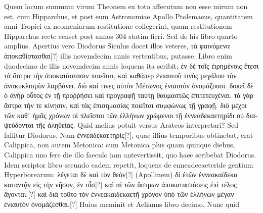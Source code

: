 Quem locum summum virum Theonem ex toto affecutum non
esse mirum non est, cum Hipparchus, et post eum Astronomiae
Apollo Ptolemaeus, quantitatem anni Tropici ex neomeniarum
restitutione collegerint, quam restitutionem Hipparchus recte
censet post annos 304 statim fieri.
Sed de his libro quarto amplius.
Apertius vero Diodorus Siculus docet illos veteres,
 \textgreek{τὰ φαινόμενα ἀποκαθίστασθαι[?]}
illis novemdecim annis vertentibus, putasse.
Libro
enim duodecimo de illis novemdecim annis loquens ita scribit;
\textgreek{ἐν δὲ τοῖς ἐιρημένοις ἔτεσι τὰ ἄστρα τὴν ἀποκατάστασιν ποιεῖται,
 καὶ καθάπερ
ἐνιαυτοῦ τινὸς μεγάλου τὸν ἀνακυκλισμὸν λαμβάνει.}
\textgreek{διὸ καί τινες αὐτὸν Μέτωνος
ἐνιαυτὸν ὀνομάζουσι.}
\textgreek{δοκεῖ δὲ ὁ ἀνὴρ οὗτος ἐν τῇ προῤῥήσει καὶ προγραφῇ
ταύτῃ θαυμαστῶς ἐπιτετευχέναι.}
\textgreek{τὰ γὰρ ἄστρα τήν τε κίνησιν, καὶ τὰς ἐπισημασίας
ποιεῖται συμφώνως τῇ γραφῇ.}
\textgreek{διὸ μέχρι τῶν καθ᾽ ἡμᾶς χρόνων οἱ πλεῖστοι
τῶν ἑλλήνων χρώμενοι τῇ ἐννεαδεκαετηρίδι οὐ διαψεύδονται τῆς ἀληθείας.}
Quid melius potuit versus Arateos interpretari?
Sed fallitur Diodorus.
Nam \textgreek{ἐννεαδεκαετηρὶς[?]}, quae illius temporibus obtinebat,
 erat
Calippica, non autem Metonica: cum Metonica plus quam
quinque diebus, Calippica uno fere die illo faeculo iam antevertissit,
quo haec scribebat Diodorus.
Idem scriptor libro secundo
eadem repetit, loquens de enneadecaeteride gentium Hyperborearum:
\textgreek{λέγεται δὲ καὶ τὸν θεὸν[?]} (Apollinem)
 \textgreek{δἰ ἐτῶν ἐννεακαίδεκα καταντᾷν
εἰς τἠν νῆσον, ἐν σἷσ[?] καὶ αἱ τῶν ἄστρων ἀποκαταστάσεις ἐπὶ τέλος ἄγονται.[?]}
\textgreek{καὶ
διὰ τοῦτο τὸν ἐννεακαιδεκαετῆ χρόνον ὑπὸ τῶν ἑλλήνων μέγαν ἐνιαυτὸν
 ὀνομάζεσθαι.[?]}
Huius meminit et Aelianus libro decimo.
Nunc quid
